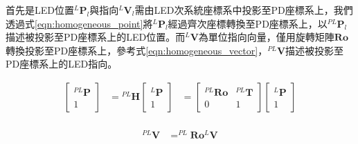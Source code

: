 

            
                首先是LED位置$^L \boldsymbol{P}_l$與指向$^L \boldsymbol{V}_l$需由LED次系統座標系中投影至PD座標系上，我們透過式\ref{eqn:homogeneous_point}將$^L \boldsymbol{P}_l$經過齊次座標轉換至PD座標系上，以$^{PL} \boldsymbol{P}_l$描述被投影至PD座標系上的LED位置。而$^L \boldsymbol{V}$為單位指向向量，僅用旋轉矩陣$\boldsymbol{Ro}$轉換投影至PD座標系上，參考式\ref{eqn:homogeneous_vector}，$^{PL}\boldsymbol{V}$描述被投影至PD座標系上的LED指向。
        
                \begin{equation}
                    \label{eqn:homogeneous_point}
                    \begin{aligned}
                    \left[\begin{array}{cc}
                    { }^{P L} \boldsymbol{P} \\
                    1
                    \end{array}\right]&={ }^{P L} \boldsymbol{H}\left[\begin{array}{c}
                    { }^{L} \boldsymbol{P} \\
                    1
                    \end{array}\right] &=\left[\begin{array}{cc}
                    { }^{P L} \boldsymbol{R} \boldsymbol{o} & { }^{P L} \boldsymbol{T} \\
                    0 & 1
                    \end{array}\right]\left[\begin{array}{c}
                    { }^{L} \boldsymbol{P} \\
                    1
                    \end{array}\right] \\
                \end{aligned}
                \end{equation}
                
                \begin{equation}
                    \label{eqn:homogeneous_vector}
                    \begin{aligned}
                    ^{P L} \boldsymbol{V} &=^{P L} \boldsymbol{R} \boldsymbol{o} ^{L}\boldsymbol{ V} 
                    \end{aligned}
                \end{equation}
    
